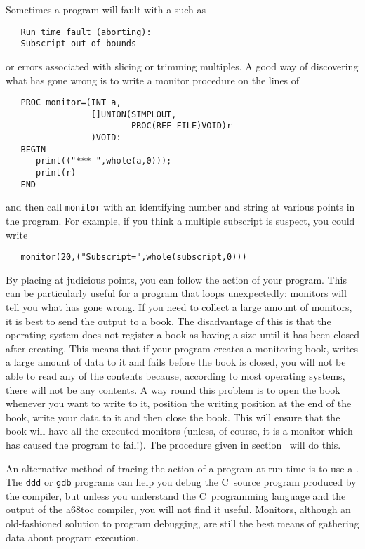 Sometimes a program will fault with a
 such as
\begin{verbatim}
   Run time fault (aborting):
   Subscript out of bounds
\end{verbatim}
\noindent
or errors associated with slicing or trimming multiples. A good way of
discovering what has gone wrong is to write a monitor procedure on the
lines of
\begin{verbatim}
   PROC monitor=(INT a,
                 []UNION(SIMPLOUT,
                         PROC(REF FILE)VOID)r
                 )VOID:
   BEGIN
      print(("*** ",whole(a,0)));
      print(r)
   END
\end{verbatim}
\noindent
and then call \verb|monitor| with an identifying number and string at
various points in the program. For example, if you think a multiple
subscript is suspect, you could write
\begin{verbatim}
   monitor(20,("Subscript=",whole(subscript,0)))
\end{verbatim}
\noindent
By placing  at judicious points, you can follow
the action of your program. This can be particularly useful for a
program that loops unexpectedly: monitors will tell you what has gone
wrong. If you need to collect a large amount of monitors, it is best to
send the output to a book. The disadvantage of this is that the
operating system does not register a book as having a size until it has
been closed after creating. This means that if your program creates a
monitoring book, writes a large amount of data to it and fails before
the book is closed, you will not be able to read any of the contents
because, according to most operating systems, there will not be any
contents. A way round this problem is to open the book whenever you
want to write to it, position the writing position at the end of the
book, write your data to it and then close the book. This will ensure
that the book will have all the executed monitors (unless, of course,
it is a monitor which has caused the program to fail!). The procedure
 given in section~ will
do this.

An alternative method of tracing the action of a program at run-time
is to use a . The \verb|ddd| or \verb|gdb| programs can
help you debug the C~source program produced by the
 compiler, but unless you understand the
C~programming language and the output of the a68toc compiler, you
will not find it useful.  Monitors, although an old-fashioned
solution to program debugging, are still the best means of gathering
data about program execution.

